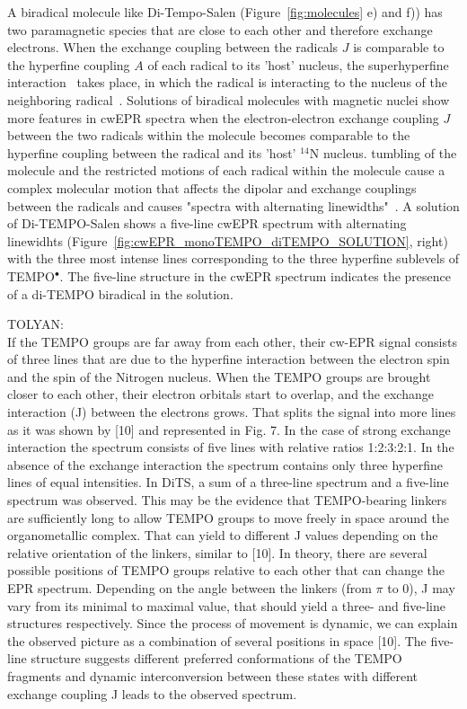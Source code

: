 \par
A biradical molecule like Di-Tempo-Salen (Figure~\ref{fig:molecules} e) and f)) has two paramagnetic species that are close to each other and therefore exchange electrons. When the exchange coupling between the radicals $J$ is comparable to the hyperfine coupling $A$ of each radical to its 'host' nucleus, the superhyperfine interaction~\cite{} takes place, in which the radical is interacting to the nucleus of the neighboring radical~\cite{Eaton2018}. Solutions of biradical molecules with magnetic nuclei show more features in cwEPR spectra when the electron-electron exchange coupling $J$ between the two radicals within the molecule becomes comparable to the hyperfine coupling between the radical and its 'host' $^{14}$N nucleus. tumbling of the molecule and the restricted motions of each radical within the molecule cause a complex molecular motion that affects the dipolar and exchange couplings between the radicals and causes "spectra with alternating linewidths"~\cite{Eaton2018,Carrington_g_factor}. A solution of Di-TEMPO-Salen shows a five-line cwEPR spectrum with alternating linewidhts (Figure~\ref{fig:cwEPR_monoTEMPO_diTEMPO_SOLUTION}, right) with the three most intense lines corresponding to the three hyperfine sublevels of TEMPO$^{\bullet}$. The five-line structure in the cwEPR spectrum indicates the presence of a di-TEMPO biradical in the solution.




\par
TOLYAN:\\
If the TEMPO groups are far away from each other, their cw-EPR signal consists of three
lines that are due to the hyperfine interaction between the electron spin and the spin of the Nitrogen
nucleus. When the TEMPO groups are brought closer to each other, their electron orbitals start to
overlap, and the exchange interaction (J) between the electrons grows. That splits the signal into
more lines as it was shown by [10] and represented in Fig. 7. In the case of strong exchange
interaction the spectrum consists of five lines with relative ratios 1:2:3:2:1. In the absence of the
exchange interaction the spectrum contains only three hyperfine lines of equal intensities.
In DiTS, a sum of a three-line spectrum and a five-line spectrum was observed. This may
be the evidence that TEMPO-bearing linkers are sufficiently long to allow TEMPO groups to move
freely in space around the organometallic complex. That can yield to different J values depending
on the relative orientation of the linkers, similar to [10]. In theory, there are several possible
positions of TEMPO groups relative to each other that can change the EPR spectrum. Depending
on the angle between the linkers (from $\pi$ to 0), J may vary from its minimal to maximal value,
that should yield a three- and five-line structures respectively. Since the process of movement is
dynamic, we can explain the observed picture as a combination of several positions in space [10].
The five-line structure suggests different preferred conformations of the TEMPO fragments and
dynamic interconversion between these states with different exchange coupling J leads to the
observed spectrum.

